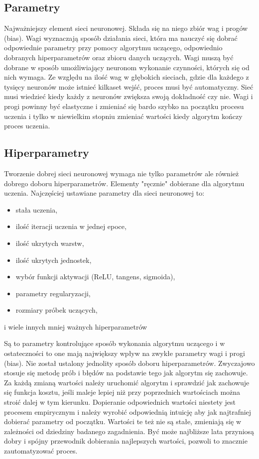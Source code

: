 \documentclass[12pt,a4paper,twoside,titlepage,openright]{book}
\begin{document}
\subsection{Parametry}
Najważniejszy element sieci neuronowej. Składa się na niego zbiór wag i progów (bias). Wagi wyznaczają sposób działania sieci, która ma nauczyć się dobrać odpowiednie parametry przy pomocy algorytmu uczącego, odpowiednio dobranych hiperparametrów oraz zbioru danych uczących. Wagi muszą być dobrane w sposób umożliwiający neuronom wykonanie czynności, których się od nich wymaga. Ze względu na ilość wag w głębokich sieciach, gdzie dla każdego z tysięcy neuronów może istnieć kilkaset wejść, proces musi być automatyczny. Sieć musi wiedzieć kiedy każdy z neuronów zwiększa swoją dokładność czy nie. Wagi i progi powinny być elastyczne i zmieniać się bardo szybko na początku procesu uczenia i tylko w niewielkim stopniu zmieniać wartości kiedy algorytm kończy proces uczenia.

\subsection{Hiperparametry}
Tworzenie dobrej sieci neuronowej wymaga nie tylko parametrów ale również dobrego doboru hiperparametrów. Elementy "ręcznie" dobierane dla algorytmu uczenia. Najczęściej ustawiane parametry dla sieci neuronowej to:
\begin{itemize}
\item stała uczenia,
\item ilość iteracji uczenia w jednej epoce,
\item ilość ukrytych warstw,
\item ilość ukrytych jednostek,
\item wybór funkcji aktywacji (ReLU, tangens, sigmoida),
\item parametry regularyzacji,
\item rozmiary próbek uczących,
\end{itemize}
i wiele innych mniej ważnych hiperparametrów

Są to parametry kontrolujące sposób wykonania algorytmu uczącego i w ostateczności to one mają największy wpływ na zwykłe parametry wagi i progi (bias). Nie został ustalony jednolity sposób doboru hiperparametrów. Zwyczajowo stosuje się metodę prób i błędów na podstawie tego jak algorytm się zachowuje.\cite{deeplearningAI} Za każdą zmianą wartości należy uruchomić algorytm i sprawdzić jak zachowuje się funkcja kosztu, jeśli maleje lepiej niż przy poprzednich wartościach można stroić dalej w tym kierunku. Dopieranie odpowiednich wartości niestety jest procesem empirycznym i należy wyrobić odpowiednią intuicję aby jak najtrafniej dobierać parametry od początku. Wartości te też nie są stałe, zmieniają się w zależności od dziedziny badanego zagadnienia. Być może najbliższe lata przyniosą dobry i spójny przewodnik dobierania najlepszych wartości, pozwoli to znacznie zautomatyzować proces.
\end{document}
